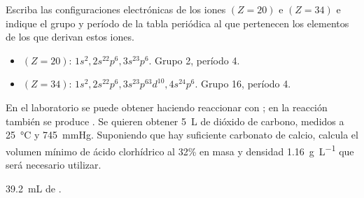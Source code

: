 \begin{exercise}[
    tags    = {configuración electrónica, electrones, átomo, ión},
    topics  = {química, cuántica, modelos atómicos},
    source  = {EBAU-Q 2013, ordinaria específica},
  ]
  Escriba las configuraciones electrónicas de los iones  \( (Z = 20) \) e   \( (Z = 34) \) e indique el grupo y período de la tabla periódica al que pertenecen los elementos de los que derivan estos iones.
\end{exercise}

\begin{solution}
  \begin{itemize}
    \item {} \( (Z = 20) \):  \( 1s^2,2s^22p^6,3s^23p^6 \). Grupo 2, período 4.
    \item {} \( (Z = 34) \):  \( 1s^2,2s^22p^6,3s^23p^63d^{10},4s^24p^6 \). Grupo 16, período 4.
  \end{itemize}
\end{solution}




\begin{exercise}[
    tags    = {clorhídrico, CO2, HCl, CaCO3, disolución, porcentaje en masa, densidad},
    topics  = {química, reaccion, estequiometría, disoluciones},
    source  = {FQ 1B ANA 2015, p117, e38},
  ]
  En el laboratorio se puede obtener  haciendo reaccionar  con ; en la reacción también se produce . Se quieren obtener \SI{5}{\liter} de dióxido de carbono, medidos a \SI{25}{\celsius} y \SI{745}{\mmHg}. Suponiendo que hay suficiente carbonato de calcio, calcula el volumen mínimo de ácido clorhídrico al 32\% en masa y densidad \SI{1,16}{\gram\per\liter} que será necesario utilizar.
\end{exercise}

\begin{solution}
  \SI{39,2}{\milli\liter} de .
\end{solution}



